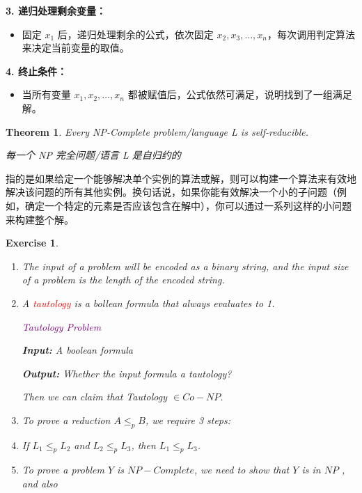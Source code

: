 \documentclass{article}
\newtheorem*{Theorem}{Theorem}
\newtheorem*{Exercise}{Exercise}
\begin{document}
\textbf{3. 递归处理剩余变量：}
\begin{itemize}
    \item 固定 $x_1$ 后，递归处理剩余的公式，依次固定 $x_2, x_3, \dots, x_n$，每次调用判定算法来决定当前变量的取值。
\end{itemize}\par

\textbf{4. 终止条件：}
\begin{itemize}
    \item 当所有变量 $x_1, x_2, \dots, x_n$ 都被赋值后，公式依然可满足，说明找到了一组满足解。
\end{itemize}

\begin{Theorem}
    Every NP-Complete problem/language L is self-reducible.

    每一个 NP 完全问题/语言 L 是自归约的
\end{Theorem}

指的是如果给定一个能够解决单个实例的算法或解，则可以构建一个算法来有效地解决该问题的所有其他实例。换句话说，如果你能有效解决一个小的子问题（例如，确定一个特定的元素是否应该包含在解中），你可以通过一系列这样的小问题来构建整个解。

\begin{Exercise}
    \begin{enumerate}
        \item The input of a problem will be encoded as a binary string, and the input size of a problem is the length of the encoded string.
        \item A \textcolor{red}{tautology} is a bollean formula that always evaluates to 1. 
        
        \textcolor{purple}{Tautology Problem}\par
        \textbf{Input:} A boolean formula\par
        \textbf{Output:} Whether the input formula a tautology?\par
        Then we can claim that Tautology $\in Co-NP$.
        \item To prove a reduction $A \leq_p B$, we require 3 steps:
        \item If $L_1 \le_p L_2$ and $L_2 \le_p L_3$, then $L_1 \le_p L_3$.
        \item To prove a problem $Y$ is $NP-Complete$, we need to show that $Y$ is in $NP$ , and also
    \end{enumerate}
\end{Exercise}
\end{document}
